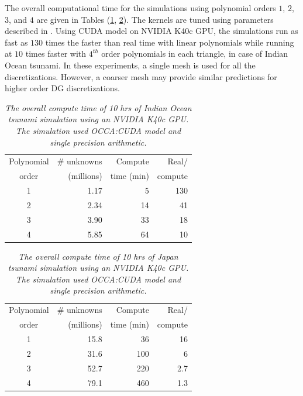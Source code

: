  The overall computational time for the simulations using polynomial orders $1$, $2$, $3$, and $4$ are given in Tables (\ref{tab:pasidgTiming}, \ref{tab:worldOceanTiming}).  The kernels are tuned using parameters described in \cite{gandham2014swe}. Using CUDA model on NVIDIA K40c GPU, the simulations run as fast as $130$ times the faster than real time with linear polynomials while running at $10$ times faster with $4^{th}$ order polynomials in each triangle, in case of Indian Ocean tsunami.
In these experiments, a single mesh is used for all the discretizations. However, a coarser mesh may provide similar predictions for higher order DG discretizations.
\begin{table}[h!]
\begin{center}
\begin{tabular}{crrr}
\hline
Polynomial & \# unknowns & Compute& Real/  \\
order & (millions)& time (min) & compute\\ \hline
1 & 1.17 &  5 & 130\\
2 & 2.34 & 14 &  41\\
3 & 3.90 & 33 &  18\\
4 & 5.85 & 64 &  10\\\hline
\end{tabular}
\caption{\emph{The overall compute time of 10 hrs of Indian Ocean tsunami simulation using an NVIDIA K40c GPU. The simulation used OCCA:CUDA model and single precision arithmetic.}}
\label{tab:pasidgTiming}
\end{center}
\end{table}

\begin{table}[h!]
\begin{center}
\begin{tabular}{crrr}
\hline
Polynomial & \# unknowns & Compute& Real/  \\
order & (millions)& time (min) & compute\\ \hline
1 & 15.8 &  36 & 16\\
2 & 31.6 & 100 &  6\\
3 & 52.7 & 220 & 2.7\\
4 & 79.1 & 460 & 1.3\\\hline
\end{tabular}
\caption{\emph{The overall compute time of 10 hrs of Japan tsunami
simulation using an NVIDIA K40c GPU. The simulation used OCCA:CUDA model
and single precision arithmetic.}}
\label{tab:worldOceanTiming}
\end{center}
\end{table}






